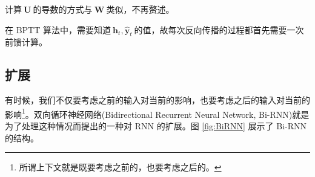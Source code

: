 \documentclass[12pt,a4paper]{article}
\begin{document}
计算$\:\bm{U}\:$的导数的方式与$\:\bm{W}\:$类似，不再赘述。

在 {\crimson BPTT} 算法中，需要知道$\:\bm{h}_t,\hat{\bm{y}}_t\:$的值，故每次反向传播的过程都首先需要一次前馈计算。

\subsection{扩展}

有时候，我们不仅要考虑之前的输入对当前的影响，也要考虑之后的输入对当前的影响\footnote{\hei 所谓上下文就是既要考虑之前的，也要考虑之后的。}。{\hei 双向循环神经网络}({\crimson Bidirectional Recurrent Neural Network, Bi-RNN}){\kai \cite{schuster1997bidirectional}}就是为了处理这种情况而提出的一种对 {\crimson RNN} 的扩展。图 {\kai \ref{fig:BiRNN}} 展示了 {\crimson Bi-RNN} 的结构。
\end{document}

